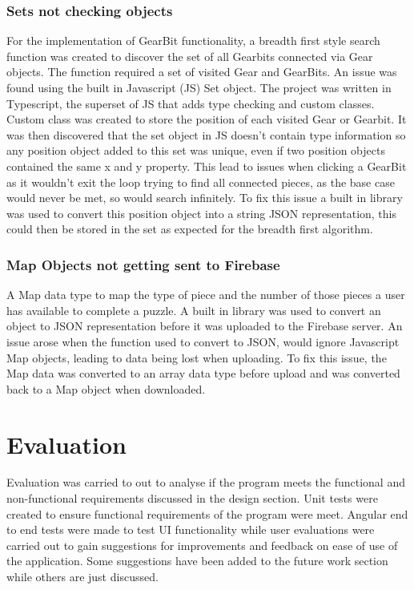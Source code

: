\documentclass{l4proj}
\begin{document}
\subsection{Sets not checking objects}
For the implementation of GearBit functionality, a breadth first style search function was created to discover the set of all Gearbits connected via Gear objects. The function required a set of visited Gear and GearBits. An issue was found using the built in Javascript (JS) Set object. The project was written in Typescript, the superset of JS that adds type checking and custom classes. Custom class was created to store the position of each visited Gear or Gearbit. It was then discovered that the set object in JS doesn't contain type information so any position object added to this set was unique, even if two position objects contained the same x and y property. This lead to issues when clicking a GearBit as it wouldn't exit the loop trying to find all connected pieces, as the base case would never be met, so would search infinitely.  To fix this issue a built in library was used to convert this position object into a string JSON representation, this could then be stored in the set as expected for the breadth first algorithm. 

\subsection{Map Objects not getting sent to Firebase}
A Map data type to map the type of piece and the number of those pieces a user has available to complete a puzzle. A built in library was used to convert an object to JSON representation before it was uploaded to the Firebase server. An issue arose when the function used to convert to JSON, would ignore Javascript Map objects, leading to data being lost when uploading. To fix this issue, the Map data was converted to an array data type before upload and was converted back to a Map object when downloaded.

\chapter{Evaluation} 

Evaluation was carried to out to analyse if the program meets the functional and non-functional requirements discussed in the design section. Unit tests were created to ensure functional requirements of the program were meet. Angular end to end tests were made to test UI functionality while user evaluations were carried out to gain suggestions for improvements and feedback on ease of use of the application. Some suggestions have been added to the future work section while others are just discussed. 
\end{document}
